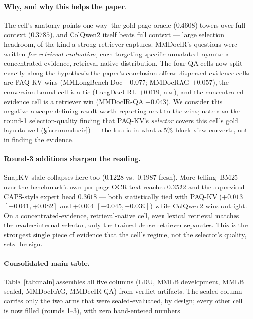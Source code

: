\documentclass[letterpaper]{article} %
\newcommand{\paqc}{\textsc{PAQ-KV}}
\begin{document}
\paragraph{Why, and why this helps the paper.} The cell's anatomy points one way: the gold-page oracle ($0.4608$) towers over full context ($0.3785$), and ColQwen2 itself beats full context --- large selection headroom, of the kind a strong retriever captures. MMDocIR's questions were written \emph{for retrieval evaluation}, each targeting specific annotated layouts: a concentrated-evidence, retrieval-native distribution. The four QA cells now split exactly along the hypothesis the paper's conclusion offers: dispersed-evidence cells are \paqc{} wins (MMLongBench-Doc $+0.077$; MMDocRAG $+0.057$), the conversion-bound cell is a tie (LongDocURL $+0.019$, n.s.), and the concentrated-evidence cell is a retriever win (MMDocIR-QA $-0.043$). We consider this negative a scope-defining result worth reporting next to the wins; note also the round-1 selection-quality finding that \paqc{}'s \emph{selector} covers this cell's gold layouts well (\S\ref{sec:mmdocir}) --- the loss is in what a 5\% block view converts, not in finding the evidence.

\paragraph{Round-3 additions sharpen the reading.} SnapKV-stale collapses here too ($0.1228$ vs.\ $0.1987$ fresh). More telling: BM25 over the benchmark's own per-page OCR text reaches $0.3522$ and the supervised CAPS-style expert head $0.3618$ --- both statistically tied with \paqc{} ($+0.013$ $[-0.041,+0.082]$ and $+0.004$ $[-0.045,+0.039]$) while ColQwen2 wins outright. On a concentrated-evidence, retrieval-native cell, even lexical retrieval matches the reader-internal selector; only the trained dense retriever separates. This is the strongest single piece of evidence that the cell's regime, not the selector's quality, sets the sign.

\paragraph{Consolidated main table.} Table~\ref{tab:main} assembles all five columns (LDU, MMLB development, MMLB sealed, MMDocRAG, MMDocIR-QA) from verdict artifacts. The sealed column carries only the two arms that were sealed-evaluated, by design; every other cell is now filled (rounds 1--3), with zero hand-entered numbers.
\end{document}

